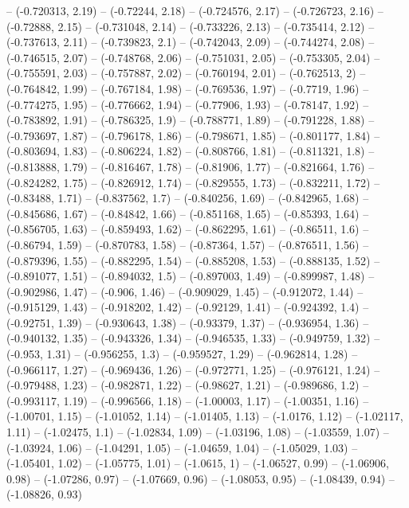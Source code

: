 -- (-0.720313, 2.19)
-- (-0.72244, 2.18)
-- (-0.724576, 2.17)
-- (-0.726723, 2.16)
-- (-0.72888, 2.15)
-- (-0.731048, 2.14)
-- (-0.733226, 2.13)
-- (-0.735414, 2.12)
-- (-0.737613, 2.11)
-- (-0.739823, 2.1)
-- (-0.742043, 2.09)
-- (-0.744274, 2.08)
-- (-0.746515, 2.07)
-- (-0.748768, 2.06)
-- (-0.751031, 2.05)
-- (-0.753305, 2.04)
-- (-0.755591, 2.03)
-- (-0.757887, 2.02)
-- (-0.760194, 2.01)
-- (-0.762513, 2)
-- (-0.764842, 1.99)
-- (-0.767184, 1.98)
-- (-0.769536, 1.97)
-- (-0.7719, 1.96)
-- (-0.774275, 1.95)
-- (-0.776662, 1.94)
-- (-0.77906, 1.93)
-- (-0.78147, 1.92)
-- (-0.783892, 1.91)
-- (-0.786325, 1.9)
-- (-0.788771, 1.89)
-- (-0.791228, 1.88)
-- (-0.793697, 1.87)
-- (-0.796178, 1.86)
-- (-0.798671, 1.85)
-- (-0.801177, 1.84)
-- (-0.803694, 1.83)
-- (-0.806224, 1.82)
-- (-0.808766, 1.81)
-- (-0.811321, 1.8)
-- (-0.813888, 1.79)
-- (-0.816467, 1.78)
-- (-0.81906, 1.77)
-- (-0.821664, 1.76)
-- (-0.824282, 1.75)
-- (-0.826912, 1.74)
-- (-0.829555, 1.73)
-- (-0.832211, 1.72)
-- (-0.83488, 1.71)
-- (-0.837562, 1.7)
-- (-0.840256, 1.69)
-- (-0.842965, 1.68)
-- (-0.845686, 1.67)
-- (-0.84842, 1.66)
-- (-0.851168, 1.65)
-- (-0.85393, 1.64)
-- (-0.856705, 1.63)
-- (-0.859493, 1.62)
-- (-0.862295, 1.61)
-- (-0.86511, 1.6)
-- (-0.86794, 1.59)
-- (-0.870783, 1.58)
-- (-0.87364, 1.57)
-- (-0.876511, 1.56)
-- (-0.879396, 1.55)
-- (-0.882295, 1.54)
-- (-0.885208, 1.53)
-- (-0.888135, 1.52)
-- (-0.891077, 1.51)
-- (-0.894032, 1.5)
-- (-0.897003, 1.49)
-- (-0.899987, 1.48)
-- (-0.902986, 1.47)
-- (-0.906, 1.46)
-- (-0.909029, 1.45)
-- (-0.912072, 1.44)
-- (-0.915129, 1.43)
-- (-0.918202, 1.42)
-- (-0.92129, 1.41)
-- (-0.924392, 1.4)
-- (-0.92751, 1.39)
-- (-0.930643, 1.38)
-- (-0.93379, 1.37)
-- (-0.936954, 1.36)
-- (-0.940132, 1.35)
-- (-0.943326, 1.34)
-- (-0.946535, 1.33)
-- (-0.949759, 1.32)
-- (-0.953, 1.31)
-- (-0.956255, 1.3)
-- (-0.959527, 1.29)
-- (-0.962814, 1.28)
-- (-0.966117, 1.27)
-- (-0.969436, 1.26)
-- (-0.972771, 1.25)
-- (-0.976121, 1.24)
-- (-0.979488, 1.23)
-- (-0.982871, 1.22)
-- (-0.98627, 1.21)
-- (-0.989686, 1.2)
-- (-0.993117, 1.19)
-- (-0.996566, 1.18)
-- (-1.00003, 1.17)
-- (-1.00351, 1.16)
-- (-1.00701, 1.15)
-- (-1.01052, 1.14)
-- (-1.01405, 1.13)
-- (-1.0176, 1.12)
-- (-1.02117, 1.11)
-- (-1.02475, 1.1)
-- (-1.02834, 1.09)
-- (-1.03196, 1.08)
-- (-1.03559, 1.07)
-- (-1.03924, 1.06)
-- (-1.04291, 1.05)
-- (-1.04659, 1.04)
-- (-1.05029, 1.03)
-- (-1.05401, 1.02)
-- (-1.05775, 1.01)
-- (-1.0615, 1)
-- (-1.06527, 0.99)
-- (-1.06906, 0.98)
-- (-1.07286, 0.97)
-- (-1.07669, 0.96)
-- (-1.08053, 0.95)
-- (-1.08439, 0.94)
-- (-1.08826, 0.93)
